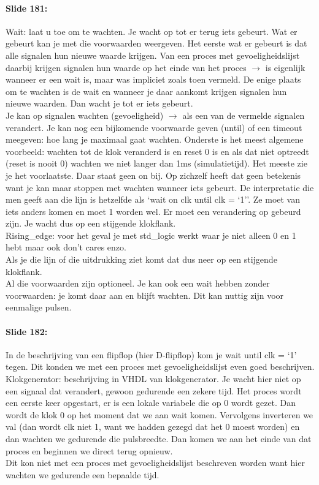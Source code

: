 \documentclass[10pt,a4paper]{book}
\begin{document}
\paragraph{Slide 181:} Wait: laat u toe om te wachten. Je wacht op tot er terug iets gebeurt. Wat er gebeurt kan je met die voorwaarden weergeven. Het eerste wat er gebeurt is dat alle signalen hun nieuwe waarde krijgen. Van een proces met gevoeligheidslijst daarbij krijgen signalen hun waarde op het einde van het proces $\rightarrow$ is eigenlijk wanneer er een wait is, maar was impliciet zoals toen vermeld. De enige plaats om te wachten is de wait en wanneer je daar aankomt krijgen signalen hun nieuwe waarden. Dan wacht je tot er iets gebeurt.\\
Je kan op signalen wachten (gevoeligheid) $\rightarrow$ als een van de vermelde signalen verandert. Je kan nog een bijkomende voorwaarde geven (until) of een timeout meegeven: hoe lang je maximaal gaat wachten. Onderste is het meest algemene voorbeeld: wachten tot de klok veranderd is en reset 0 is en als dat niet optreedt (reset is nooit 0) wachten we niet langer dan 1ms (simulatietijd). Het meeste zie je het voorlaatste. Daar staat geen on bij. Op zichzelf heeft dat geen betekenis want je kan maar stoppen met wachten wanneer iets gebeurt. De interpretatie die men geeft aan die lijn is hetzelfde als `wait on clk until clk = `1''. Ze moet van iets anders komen en moet 1 worden wel. Er moet een verandering op gebeurd zijn. Je wacht dus op een stijgende klokflank.\\
Rising\_edge: voor het geval je met std\_logic werkt waar je niet alleen 0 en 1 hebt maar ook don't cares enzo.\\
Als je die lijn of die uitdrukking ziet komt dat dus neer op een stijgende klokflank.\\
Al die voorwaarden zijn optioneel. Je kan ook een wait hebben zonder voorwaarden: je komt daar aan en blijft wachten. Dit kan nuttig zijn voor eenmalige pulsen. 

\paragraph{Slide 182:} In de beschrijving van een flipflop (hier D-flipflop) kom je wait until clk = `1' tegen. Dit konden we met een proces met gevoeligheidslijst even goed beschrijven.\\
Klokgenerator: beschrijving in VHDL van klokgenerator. Je wacht hier niet op een signaal dat verandert, gewoon gedurende een zekere tijd. Het proces wordt een eerste keer opgestart, er is een lokale variabele die op 0 wordt gezet. Dan wordt de klok 0 op het moment dat we aan wait komen. Vervolgens inverteren we val (dan wordt clk niet 1, want we hadden gezegd dat het 0 moest worden) en dan wachten we gedurende die pulsbreedte. Dan komen we aan het einde van dat proces en beginnen we direct terug opnieuw.\\
Dit kon niet met een proces met gevoeligheidslijst beschreven worden want hier wachten we gedurende een bepaalde tijd.
\end{document}
